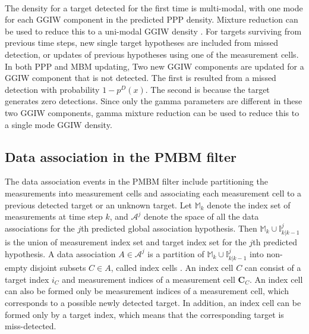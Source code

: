 ~\\
The density for a target detected for the first time is multi-modal, with one mode for each GGIW component in the predicted PPP density. Mixture reduction can be used to reduce this to a uni-modal GGIW density \cite{phdextended,gammareduction}. For targets surviving from previous time steps, new single target hypotheses are included from missed detection, or updates of previous hypotheses using one of the measurement cells. 
In both PPP and MBM updating, Two new GGIW components are updated for a GGIW component that is not detected. The first is resulted from a missed detection with probability $1-p^D(x)$. The second is because the target generates zero detections. Since only the gamma parameters are different in these two GGIW components, gamma mixture reduction \cite{gammareduction} can be used to reduce this to a single mode GGIW density. 

\subsection{Data association in the PMBM filter}
The data association events in the PMBM filter include partitioning the measurements into measurement cells and associating each measurement cell to a previous detected target or an unknown target. Let $\mathbb{M}_k$ denote the index set of measurements at time step $k$, and $\mathcal{A}^j$ denote the space of all the data associations for the $j$th predicted global association hypothesis. Then $\mathbb{M}_k\cup\mathbb{I}^j_{k|k-1}$ is the union of measurement index set and target index set for the $j$th predicted hypothesis. A data association $A\in\mathcal{A}^j$ is a partition of $\mathbb{M}_k\cup\mathbb{I}^j_{k|k-1}$ into non-empty disjoint subsets $C\in A$, called index cells \cite{pmbmextended2}. An index cell $C$ can consist of a target index $i_C$ and measurement indices of a measurement cell $\mathbf{C}_C$. An index cell can also be formed only be measurement indices of a measurement cell, which corresponds to a possible newly detected target. In addition, an index cell can be formed only by a target index, which means that the corresponding target is miss-detected. 

